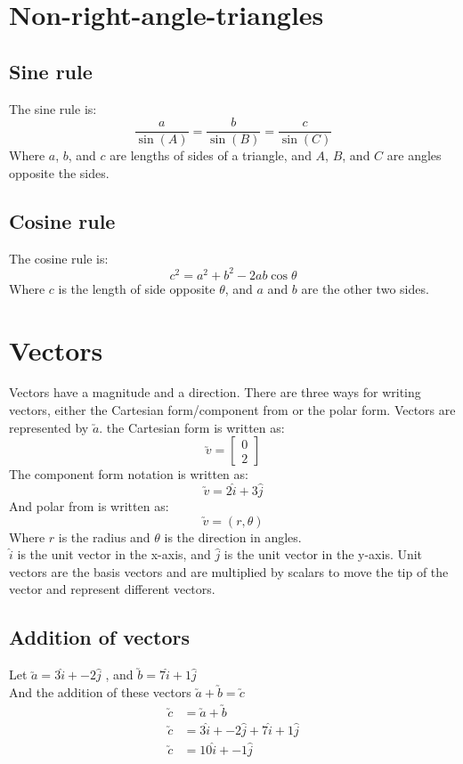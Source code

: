 \documentclass{book}
\begin{document}
\chapter{Non-right-angle-triangles}
\section{Sine rule}
The sine rule is:
\[
	\frac{a}{\sin(A)} = \frac{b}{\sin(B)} = \frac{c}{\sin(C)}
\]
Where $a$, $b$, and $c$ are lengths of sides of a triangle, and $A$, $B$, and $C$ are angles opposite the sides.

\section{Cosine rule}
The cosine rule is:
\[
	c^2 = a^2 + b^2 -2ab\cos\theta
\]
Where $c$ is the length of side opposite $\theta$, and $a$ and $b$ are the other two sides.

\chapter{Vectors}
Vectors have a magnitude and a direction.  There are three ways for writing vectors, either the Cartesian form/component from or the polar form.  Vectors are represented by $\utilde{a}$.  the Cartesian form is written as:
\[
	\utilde{v} = \begin{bmatrix}
		0 \\
		2
	\end{bmatrix}
\]
The component form notation is written as:
\[
	\utilde{v} = 2\hat{i} + 3\hat{j}
\]
And polar from is written as:
\[
	\utilde{v} = (r, \theta)
\]
Where $r$ is the radius and $\theta$ is the direction in angles.\\

$\hat{i}$ is the unit vector in the x-axis, and $\hat{j}$ is the unit vector in the y-axis.  Unit vectors are the basis vectors and are multiplied by scalars to move the tip of the vector and represent different vectors.

\section{Addition of vectors}
Let $\utilde{a} = 3\hat{i} + -2\hat{j}$ , and $\utilde{b} = 7\hat{i} + 1\hat{j}$\\
And the addition of these vectors $\utilde{a} + \utilde{b} = \utilde{c}$\\
\begin{align*}
	\utilde{c} & = \utilde{a} + \utilde{b}                    \\
	\utilde{c} & = 3\hat{i} + -2\hat{j} + 7\hat{i} + 1\hat{j} \\
	\utilde{c} & = 10\hat{i} + -1\hat{j}
\end{align*}
\end{document}

